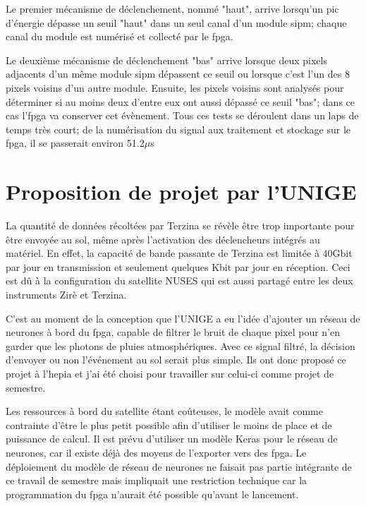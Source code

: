 Le premier mécanisme de déclenchement, nommé "haut", arrive lorsqu'un pic d'énergie dépasse un seuil "haut" dans un seul canal
d'un module \gls{sipm}; chaque canal du module est numérisé et collecté par le \gls{fpga}. 

Le deuxième mécanisme de déclenchement "bas" arrive lorsque deux pixels adjacents d'un même module \gls{sipm}
dépassent ce seuil ou lorsque c'est l'un des 8 pixels voisins d'un autre module. 
Ensuite, les pixels voisins sont analysés pour déterminer si au moins deux d'entre eux ont aussi dépassé ce seuil "bas"; dans ce cas l'\gls{fpga} va conserver cet évènement.
Tous ces tests se déroulent dans un laps de temps très court; de la numérisation du signal aux traitement et stockage sur le \gls{fpga}, il se passerait environ 51.2$\mu$s

\section{Proposition de projet par l'UNIGE}

La quantité de données récoltées par Terzina se révèle être trop importante pour être envoyée au sol, même après l'activation des déclencheurs intégrés au matériel.
En effet, la capacité de bande passante de Terzina est limitée à 40Gbit par jour en transmission et seulement quelques Kbit par jour en réception.
Ceci est dû à la configuration du satellite NUSES qui est aussi partagé entre les deux instruments Zirè et Terzina.

C'est au moment de la conception que l'UNIGE a eu l'idée d'ajouter un réseau de neurones à bord du \gls{fpga}, capable de filtrer
le bruit de chaque pixel pour n'en garder que les photons de pluies atmosphériques. 
Avec ce signal filtré, la décision d'envoyer ou non l'événement au sol serait plus simple. 
Ils ont donc proposé ce projet à l'\gls{hepia} et j'ai été choisi pour travailler sur celui-ci comme projet de semestre.

Les ressources à bord du satellite étant coûteuses, le modèle avait comme contrainte d'être le plus petit possible 
afin d'utiliser le moins de place et de puissance de calcul.
Il est prévu d'utiliser un modèle Keras pour le réseau de neurones, car il existe déjà des moyens de l'exporter vers des \gls{fpga}.
Le déploiement du modèle de réseau de neurones ne faisait pas partie intégrante de ce travail de semestre mais impliquait une
restriction technique car la programmation du \gls{fpga} n'aurait été possible qu'avant le lancement.

